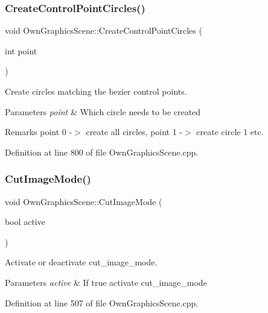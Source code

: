 \subsubsection{\texorpdfstring{Create\+Control\+Point\+Circles()}{CreateControlPointCircles()}}
{\footnotesize\ttfamily void Own\+Graphics\+Scene\+::\+Create\+Control\+Point\+Circles (\begin{DoxyParamCaption}\item[{int}]{point }\end{DoxyParamCaption})}



Create circles matching the bezier control points. 


\begin{DoxyParams}{Parameters}
{\em point} & Which circle needs to be created \\
\hline
\end{DoxyParams}
\begin{DoxyRemark}{Remarks}
point 0 -\/$>$ create all circles, point 1 -\/$>$ create circle 1 etc. 
\end{DoxyRemark}


Definition at line 800 of file Own\+Graphics\+Scene.\+cpp.

\mbox{\label{classOwnGraphicsScene_a3ce5a34cebcc134ecb20323c48e5812b}} 
\subsubsection{\texorpdfstring{Cut\+Image\+Mode()}{CutImageMode()}}
{\footnotesize\ttfamily void Own\+Graphics\+Scene\+::\+Cut\+Image\+Mode (\begin{DoxyParamCaption}\item[{bool}]{active }\end{DoxyParamCaption})}



Activate or deactivate cut\+\_\+image\+\_\+mode. 


\begin{DoxyParams}{Parameters}
{\em active} & If true activate cut\+\_\+image\+\_\+mode \\
\hline
\end{DoxyParams}


Definition at line 507 of file Own\+Graphics\+Scene.\+cpp.

